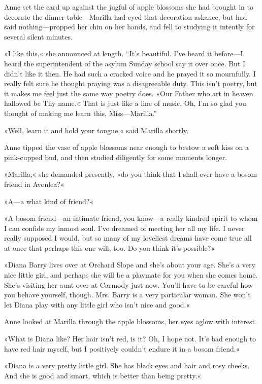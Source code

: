 Anne set the card up against the jugful of apple blossoms she had brought in to decorate the dinner-table—Marilla had eyed that decoration askance, but had said nothing—propped her chin on her hands, and fell to studying it intently for several silent minutes.

»I like this,« she announced at length. “It's beautiful. I've heard it before—I heard the superintendent of the asylum Sunday school say it over once. But I didn't like it then. He had such a cracked voice and he prayed it so mournfully. I really felt sure he thought praying was a disagreeable duty. This isn't poetry, but it makes me feel just the same way poetry does. »Our Father who art in heaven hallowed be Thy name.« That is just like a line of music. Oh, I'm so glad you thought of making me learn this, Miss—Marilla.”

»Well, learn it and hold your tongue,« said Marilla shortly.

Anne tipped the vase of apple blossoms near enough to bestow a soft kiss on a pink-cupped bud, and then studied diligently for some moments longer.

»Marilla,« she demanded presently, »do you think that I shall ever have a bosom friend in Avonlea?«

»A—a what kind of friend?«

»A bosom friend—an intimate friend, you know—a really kindred spirit to whom I can confide my inmost soul. I've dreamed of meeting her all my life. I never really supposed I would, but so many of my loveliest dreams have come true all at once that perhaps this one will, too. Do you think it's possible?«

»Diana Barry lives over at Orchard Slope and she's about your age. She's a very nice little girl, and perhaps she will be a playmate for you when she comes home. She's visiting her aunt over at Carmody just now. You'll have to be careful how you behave yourself, though. Mrs. Barry is a very particular woman. She won't let Diana play with any little girl who isn't nice and good.«

Anne looked at Marilla through the apple blossoms, her eyes aglow with interest.

»What is Diana like? Her hair isn't red, is it? Oh, I hope not. It's bad enough to have red hair myself, but I positively couldn't endure it in a bosom friend.«

»Diana is a very pretty little girl. She has black eyes and hair and rosy cheeks. And she is good and smart, which is better than being pretty.«

